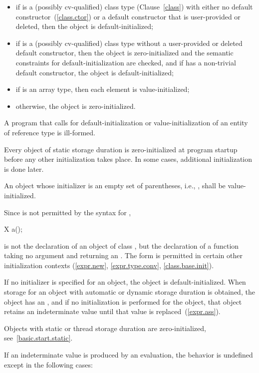 \begin{itemize}
\item
if
is a (possibly cv-qualified) class type (Clause~\ref{class}) with
either no default constructor~(\ref{class.ctor}) or a default
constructor that is user-provided or deleted, then the object is default-initialized;

\item
if
is a (possibly cv-qualified) class type without a
user-provided or deleted default constructor,
then the object is zero-initialized and the semantic constraints for
default-initialization are checked, and if  has a
non-trivial default constructor, the object is default-initialized;

\item
if
is an array type, then each element is value-initialized;

\item
otherwise, the object is zero-initialized.
\end{itemize}

\pnum
A program that calls for default-initialization
or value-initialization
of an entity
of reference type is ill-formed.

\pnum
\begin{note} Every
object of static storage duration is
zero-initialized at program startup before any other initialization
takes place.
In some cases, additional initialization is done later.
\end{note}

\pnum
An object whose initializer is an empty set of parentheses, i.e.,
\tcode{()},
shall be
value-initialized.

%
\begin{note}
Since
\tcode{()}
is not permitted by the syntax for
,

\begin{codeblock}
X a();
\end{codeblock}

is not the declaration of an object of class
,
but the declaration of a function taking no argument and returning an
.
The form
\tcode{()}
is permitted in certain other initialization contexts (\ref{expr.new},
\ref{expr.type.conv}, \ref{class.base.init}).
\end{note}

\pnum
{}%
%
If no initializer is specified for an object, the object is default-initialized.
When storage for an object with automatic or dynamic storage duration
is obtained, the object has an , and if
no initialization is performed for the object, that object retains an
indeterminate value until that value is replaced~(\ref{expr.ass}).
\begin{note} Objects with static or thread storage duration are zero-initialized,
see~\ref{basic.start.static}. \end{note}
If an indeterminate value is produced by an evaluation, the behavior is
undefined except in the following cases:

